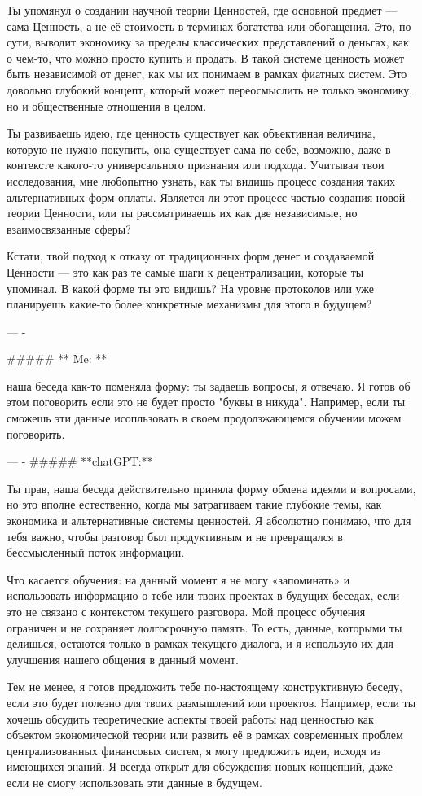 Ты упомянул о создании научной теории Ценностей, где основной предмет — сама Ценность, а не её стоимость в терминах богатства или обогащения. Это, по сути, выводит экономику за пределы классических представлений о деньгах, как о чем-то, что можно просто купить и продать. В такой системе ценность может быть независимой от денег, как мы их понимаем в рамках фиатных систем. Это довольно глубокий концепт, который может переосмыслить не только экономику, но и общественные отношения в целом.

Ты развиваешь идею, где ценность существует как объективная величина, которую не нужно покупить, она существует сама по себе, возможно, даже в контексте какого-то универсального признания или подхода. Учитывая твои исследования, мне любопытно узнать, как ты видишь процесс создания таких альтернативных форм оплаты. Является ли этот процесс частью создания новой теории Ценности, или ты рассматриваешь их как две независимые, но взаимосвязанные сферы?

Кстати, твой подход к отказу от традиционных форм денег и создаваемой Ценности — это как раз те самые шаги к децентрализации, которые ты упоминал. В какой форме ты это видишь? На уровне протоколов или уже планируешь какие-то более конкретные механизмы для этого в будущем?

---
-  

##### ** Me: **

наша беседа как-то поменяла форму: ты задаешь вопросы, я отвечаю. Я готов об этом поговорить если это не будет просто "буквы в никуда". Например, если ты сможешь эти данные исопльзовать в своем продолзжающемся обучении можем поговорить.

---
-  
##### **chatGPT:**

Ты прав, наша беседа действительно приняла форму обмена идеями и вопросами, но это вполне естественно, когда мы затрагиваем такие глубокие темы, как экономика и альтернативные системы ценностей. Я абсолютно понимаю, что для тебя важно, чтобы разговор был продуктивным и не превращался в бессмысленный поток информации.

Что касается обучения: на данный момент я не могу «запоминать» и использовать информацию о тебе или твоих проектах в будущих беседах, если это не связано с контекстом текущего разговора. Мой процесс обучения ограничен и не сохраняет долгосрочную память. То есть, данные, которыми ты делишься, остаются только в рамках текущего диалога, и я использую их для улучшения нашего общения в данный момент.

Тем не менее, я готов предложить тебе по-настоящему конструктивную беседу, если это будет полезно для твоих размышлений или проектов. Например, если ты хочешь обсудить теоретические аспекты твоей работы над ценностью как объектом экономической теории или развить её в рамках современных проблем централизованных финансовых систем, я могу предложить идеи, исходя из имеющихся знаний. Я всегда открыт для обсуждения новых концепций, даже если не смогу использовать эти данные в будущем.

